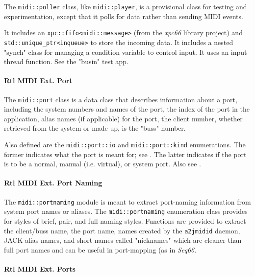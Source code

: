    The \texttt{midi::poller} class, like \texttt{midi::player},
   is a provisional class for testing and experimentation, except
   that it polls for data rather than sending MIDI events.

   It includes an \texttt{xpc::fifo<midi::message>}
   (from the \textsl{xpc66} library project) and
   \texttt{std::unique\_ptr<inqueue>} to store the incoming data.
   It includes a nested "synch" class for managing a condition variable 
   to control input.
   It uses an input thread function.
   See the "busin" test app.

\paragraph{Rtl MIDI Ext. Port}
\label{paragraph:rtl_midi_extensions_port}

   The \texttt{midi::port} class is a data class that describes information about
   a port, including the system numbers and names of the port, the index of the
   port in the application, alias names (if applicable) for the port,
   the client number, whether retrieved from the system or made up, is
   the "buss" number.

   Also defined are the \texttt{midi::port::io} and
   \texttt{midi::port::kind} enumerations.
   The former indicates what the port is meant for; see
   .
   The latter indicates if the port is to be a normal, manual (i.e. virtual),
   or system port.
   Also see .

\paragraph{Rtl MIDI Ext. Port Naming}
\label{paragraph:rtl_midi_extensions_port_naming}

   The \texttt{midi::portnaming} module
   is meant to extract port-naming information from system port names or
   aliases.
   The \texttt{midi::portnaming} enumeration class provides for
   styles of brief, pair, and full naming styles.
   Functions are provided to extract the client/buss name, the port
   name, names created by the \texttt{a2jmidid} daemon,
   JACK alias names, and short names called "nicknames" which are cleaner
   than full port names and can be useful in port-mapping (as in
   \textsl{Seq66}.

\paragraph{Rtl MIDI Ext. Ports}
\label{paragraph:rtl_midi_extensions_ports}

